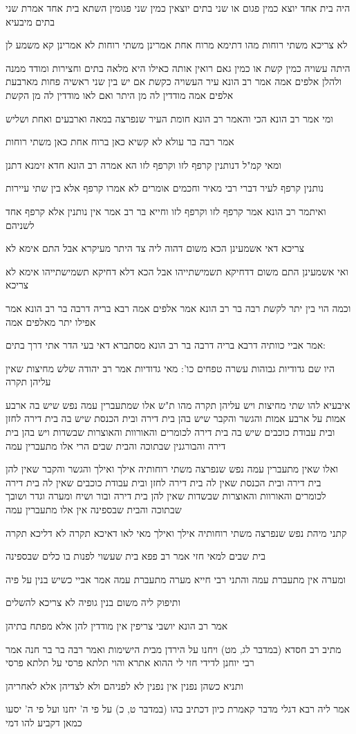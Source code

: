 \documentclass[12pt, openany]{book}
\newcommand{\sethebfont}{
\fontsize{10.5pt}{21.0pt} \selectfont
}
\newcommand{\textblock}[1]{
{\sethebfont #1\\}	
}
\begin{document}
\textblock{היה בית אחד יוצא כמין פגום או שני בתים יוצאין כמין שני פגומין השתא בית אחד אמרת שני בתים מיבעיא}
\textblock{לא צריכא משתי רוחות מהו דתימא מרוח אחת אמרינן משתי רוחות לא אמרינן קא משמע לן}
\textblock{היתה עשויה כמין קשת או כמין גאם רואין אותה כאילו היא מלאה בתים וחצירות ומודד ממנה ולהלן אלפים אמה אמר רב הונא עיר העשויה כקשת אם יש בין שני ראשיה פחות מארבעת אלפים אמה מודדין לה מן היתר ואם לאו מודדין לה מן הקשת}
\textblock{ומי אמר רב הונא הכי והאמר רב הונא חומת העיר שנפרצה במאה וארבעים ואחת ושליש}
\textblock{אמר רבה בר עולא לא קשיא כאן ברוח אחת כאן משתי רוחות}
\textblock{ומאי קמ"ל דנותנין קרפף לזו וקרפף לזו הא אמרה רב הונא חדא זימנא דתנן}
\textblock{נותנין קרפף לעיר דברי רבי מאיר וחכמים אומרים לא אמרו קרפף אלא בין שתי עיירות}
\textblock{ואיתמר רב הונא אמר קרפף לזו וקרפף לזו וחייא בר רב אמר אין נותנין אלא קרפף אחד לשניהם}
\textblock{צריכא דאי אשמעינן הכא משום דהוה ליה צד היתר מעיקרא אבל התם אימא לא}
\textblock{ואי אשמעינן התם משום דדחיקא תשמישתייהו אבל הכא דלא דחיקא תשמישתייהו אימא לא צריכא}
\textblock{וכמה הוי בין יתר לקשת רבה בר רב הונא אמר אלפים אמה רבא בריה דרבה בר רב הונא אמר אפילו יתר מאלפים אמה}
\textblock{אמר אביי כוותיה דרבא בריה דרבה בר רב הונא מסתברא דאי בעי הדר אתי דרך בתים:}
\textblock{היו שם גדודיות גבוהות עשרה טפחים כו': מאי גדודיות אמר רב יהודה שלש מחיצות שאין עליהן תקרה}
\textblock{איבעיא להו שתי מחיצות ויש עליהן תקרה מהו ת"ש אלו שמתעברין עמה נפש שיש בה ארבע אמות על ארבע אמות והגשר והקבר שיש בהן בית דירה ובית הכנסת שיש בה בית דירה לחזן ובית עבודת כוכבים שיש בה בית דירה לכומרים והאורוות והאוצרות שבשדות ויש בהן בית דירה והבורגנין שבתוכה והבית שבים הרי אלו מתעברין עמה}
\textblock{ואלו שאין מתעברין עמה נפש שנפרצה משתי רוחותיה אילך ואילך והגשר והקבר שאין להן בית דירה ובית הכנסת שאין לה בית דירה לחזן ובית עבודת כוכבים שאין לה בית דירה לכומרים והאורוות והאוצרות שבשדות שאין להן בית דירה ובור ושיח ומערה וגדר ושובך שבתוכה והבית שבספינה אין אלו מתעברין עמה}
\textblock{קתני מיהת נפש שנפרצה משתי רוחותיה אילך ואילך מאי לאו דאיכא תקרה לא דליכא תקרה}
\textblock{בית שבים למאי חזי אמר רב פפא בית שעשוי לפנות בו כלים שבספינה}
\textblock{ומערה אין מתעברת עמה והתני רבי חייא מערה מתעברת עמה אמר אביי כשיש בנין על פיה}
\textblock{ותיפוק ליה משום בנין גופיה לא צריכא להשלים}
\textblock{אמר רב הונא יושבי צריפין אין מודדין להן אלא מפתח בתיהן}
\textblock{מתיב רב חסדא (במדבר לג, מט) ויחנו על הירדן מבית הישימות ואמר רבה בר בר חנה אמר רבי יוחנן לדידי חזי לי ההוא אתרא והוי תלתא פרסי על תלתא פרסי}
\textblock{ותניא כשהן נפנין אין נפנין לא לפניהם ולא לצדיהן אלא לאחריהן}
\textblock{אמר ליה רבא דגלי מדבר קאמרת כיון דכתיב בהו (במדבר ט, כ) על פי ה' יחנו ועל פי ה' יסעו כמאן דקביע להו דמי}
\end{document}
